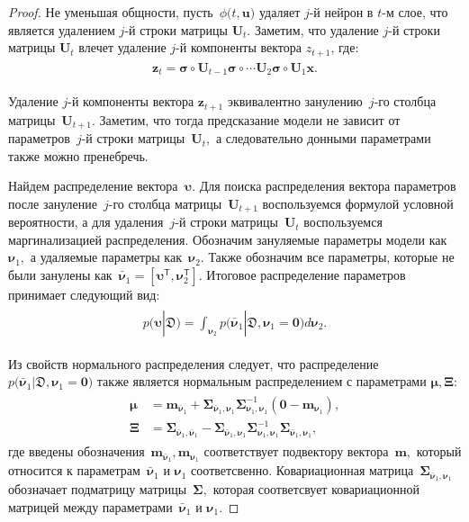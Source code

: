 \documentclass[12pt]{a&t}
\begin{document}
\begin{proof}
Не уменьшая общности, пусть~$\phi\bigr(t, \mathbf{u}\bigr)$ удаляет $j$-й нейрон в $t$-м слое, что является удалением $j$-й строки матрицы $\mathbf{U}_t$. Заметим, что удаление $j$-й строки матрицы $\mathbf{U}_t$ влечет удаление $j$-й компоненты вектора $z_{t+1}$, где:
\begin{gather}
\label{eq:ap:tr:neural:1}
\begin{aligned}
\mathbf{z}_{t} = \bm{\sigma} \circ \mathbf{U}_{t-1} \bm{\sigma} \circ \cdots  \mathbf{U}_2\bm{\sigma} \circ \mathbf{U}_1\mathbf{x}.
\end{aligned}
\end{gather}

Удаление $j$-й компоненты вектора $\mathbf{z}_{t+1}$ эквивалентно занулению~$j$-го столбца матрицы~$\mathbf{U}_{t+1}.$ Заметим, что тогда предсказание модели не зависит от параметров~$j$-й строки матрицы~$\mathbf{U}_t,$ а следовательно донными параметрами также можно пренебречь.

Найдем распределение вектора~$\bm{\upsilon}.$ Для поиска распределения вектора параметров после зануление~$j$-го столбца матрицы~$\mathbf{U}_{t+1}$ воспользуемся формулой условной вероятности, а для удаления~$j$-й строки матрицы~$\mathbf{U}_{t}$ воспользуемся маргинализацией распределения. Обозначим зануляемые параметры модели как~$\bm{\nu}_1,$ а удаляемые параметры как~$\bm{\nu}_2.$ Также обозначим все параметры, которые не были занулены как~$\bar{\bm{\nu}}_1 = [\bm{\upsilon}^{\mathsf{T}}, \bm{\nu}_2^{\mathsf{T}}].$ Итоговое распределение параметров принимает следующий вид:
\begin{gather}
\label{eq:ap:tr:1:1}
\begin{aligned}
p\bigr(\bm{\upsilon}|\mathfrak{D}\bigr)  = \int_{\bm{\nu}_2}p\bigr(\bar{\bm{\nu}}_1|\mathfrak{D}, \bm{\nu}_1=\mathbf{0}\bigr) d\bm{\nu}_2.
\end{aligned}
\end{gather}

Из свойств нормального распределения следует, что распределение~$p\bigr(\bar{\bm{\nu}}_1|\mathfrak{D}, \bm{\nu}_1=\mathbf{0}\bigr)$ также является нормальным распределением с параметрами $\bm{\mu}, \bm{\Xi}$:
\begin{gather}
\label{eq:ap:tr:1:1}
\begin{aligned}
\bm{\mu} &= \mathbf{m}_{\bar{\bm{\nu}}_1}+\bm{\Sigma}_{\bar{\bm{\nu}}_1,\bm{\nu}_1} \bm{\Sigma}_{\bm{\nu}_1,\bm{\nu}_1}^{-1} \left(\mathbf{0} - \mathbf{m}_{\bm{\nu}_1}\right), \\
 \bm{\Xi} &= \bm{\Sigma}_{\bar{\bm{\nu}}_1,\bar{\bm{\nu}}_1} - \bm{\Sigma}_{\bar{\bm{\nu}}_1,\bm{\nu}_1} \bm{\Sigma}_{\bm{\nu}_1,\bm{\nu}_1}^{-1} \bm{\Sigma}_{\bar{\bm{\nu}}_1,\bm{\nu}_1},
\end{aligned}
\end{gather}
где введены обозначения~$\mathbf{m}_{\bar{\bm{\nu}}_1}, \mathbf{m}_{\bm{\nu}_1}$ соответствует подвектору вектора~$\mathbf{m},$ который относится к параметрам~$\bar{\bm{\nu}}_1$ и $\bm{\nu}_1$ соответсвенно. Ковариационная матрица~$\bm{\Sigma}_{\bar{\bm{\nu}}_1,\bm{\nu}_1}$ обозначает подматрицу матрицы~$\bm{\Sigma},$ которая соответсвует ковариационной матрицей между параметрами~$\bar{\bm{\nu}}_1$ и $\bm{\nu}_1.$


\end{proof}
\end{document}
